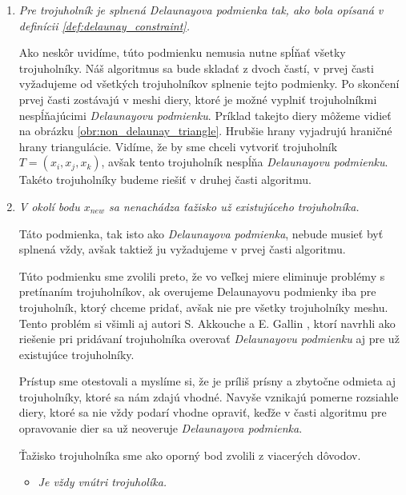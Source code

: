 \begin{enumerate}
     \item{
         \textit{Pre trojuholník je splnená \textit{Delaunayova podmienka} tak, ako bola opísaná v 
         definícii \ref{def:delaunay_constraint}.}

        Ako neskôr uvidíme, túto podmienku nemusia nutne spĺňať všetky trojuholníky. Náš algoritmus sa bude 
        skladať z dvoch častí, v prvej časti vyžadujeme od všetkých trojuholníkov splnenie tejto podmienky.
        Po skončení prvej časti zostávajú v meshi diery, ktoré je možné vyplniť trojuholníkmi nespĺňajúcimi 
        \textit{Delaunayovu podmienku}. Príklad takejto diery môžeme vidieť na obrázku 
        \ref{obr:non_delaunay_triangle}. Hrubšie hrany vyjadrujú hraničné hrany triangulácie. 
        Vidíme, že by sme chceli vytvoriť trojuholník $T = (x_i, x_j, x_k)$,
        avšak tento trojuholník nespĺňa \textit{Delaunayovu podmienku}. Takéto trojuholníky
        budeme riešiť v druhej časti algoritmu.
     }

     \item{
         \textit{V okolí bodu $x_{new}$ sa nenachádza ťažisko už existujúceho trojuholníka.}

         Táto podmienka, tak isto ako \textit{Delaunayova podmienka}, nebude musieť byť splnená vždy,
         avšak taktiež ju vyžadujeme v prvej časti algoritmu. 
         
         Túto podmienku sme zvolili preto, že vo veľkej miere eliminuje problémy s pretínaním 
         trojuholníkov, ak overujeme Delaunayovu podmienky iba pre trojuholník, ktorý chceme pridať,
         avšak nie pre všetky trojuholníky meshu. Tento problém si všimli aj autori S. Akkouche a 
         E. Gallin \cite{akkouche2001adaptive}, ktorí navrhli ako riešenie pri pridávaní trojuholníka 
         overovať \textit{Delaunayovu podmienku} aj pre už existujúce trojuholníky. 
         
         Prístup sme otestovali a myslíme si, že je príliš prísny a zbytočne odmieta aj trojuholníky, 
         ktoré sa nám zdajú vhodné. Navyše vznikajú pomerne rozsiahle diery, ktoré sa nie vždy podarí 
         vhodne opraviť, keďže v časti algoritmu pre opravovanie dier sa už neoveruje
         \textit{Delaunayova podmienka}.

         Ťažisko trojuholníka sme ako oporný bod zvolili z viacerých dôvodov.
         \begin{itemize}
            \item{
                \textit{Je vždy vnútri trojuholíka.}

}
\end{itemize}}
\end{enumerate}
